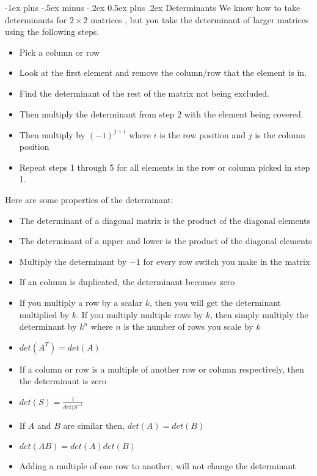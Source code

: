\documentclass[10pt,landscape]{article}
\makeatletter
\renewcommand{\section}{\@startsection{section}{1}{0mm}%
                                {-1ex plus -.5ex minus -.2ex}%
                                {0.5ex plus .2ex}%
                                {\normalfont\large\bfseries}}
\makeatother
\begin{document}
\begin{multicols}{3}
\section{Determinants}
We know how to take determinants for $2 \times 2$ matrices , but you take the determinant of larger matrices using the following steps. 
\begin{itemize}
    \item[1] Pick a column or row
    \item[2] Look at the first element and remove the column/row that the element is in.
    \item[3] Find the determinant of the rest of the matrix not being excluded.
    \item[4] Then multiply the determinant from step 2 with the element being covered.
    \item[5] Then multiply by $(-1)^{j+i}$ where $i$ is the row position and $j$ is the column position
    \item[6] Repeat steps 1 through 5 for all elements in the row or column picked in step 1. 
\end{itemize}{}

Here are some properties of the determinant:
\begin{itemize}
    \item The determinant of a diagonal matrix is the product of the diagonal elements
    \item The determinant of a upper and lower is the product of the diagonal elements
    \item Multiply the determinant by $-1$ for every row switch you make in the matrix
    \item If an column is duplicated, the determinant becomes zero
    \item If you multiply a row by a scalar $k$, then you will get the determinant multiplied by $k$. If you multiply multiple rows by $k$, then simply multiply the determinant by $k^n$ where $n$ is the number of rows you scale by $k$
    \item $det(A^T)=det(A)$
    \item If a column or row is a multiple of another row or column respectively, then the determinant is zero
    \item $det(S)=\frac{1}{det(S^{-1}}$
    \item If $A$ and $B$ are similar then, $det(A)=det(B)$
    \item $det(AB)=det(A)det(B)$
    \item Adding a multiple of one row to another, will not change the determinant
\end{itemize}


\end{multicols}
\end{document}
